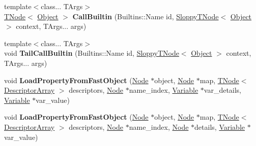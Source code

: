 \begin{DoxyCompactItemize}
\item 
\mbox{\label{classv8_1_1internal_1_1CodeStubAssembler_acec00379f57196c0fae059965a208130}} 
{\footnotesize template$<$class... T\+Args$>$ }\\\mbox{\hyperlink{classv8_1_1internal_1_1compiler_1_1TNode}{T\+Node}}$<$ \mbox{\hyperlink{classv8_1_1internal_1_1Object}{Object}} $>$ {\bfseries Call\+Builtin} (Builtins\+::\+Name id, \mbox{\hyperlink{classv8_1_1internal_1_1compiler_1_1SloppyTNode}{Sloppy\+T\+Node}}$<$ \mbox{\hyperlink{classv8_1_1internal_1_1Object}{Object}} $>$ context, T\+Args... args)
\item 
\mbox{\label{classv8_1_1internal_1_1CodeStubAssembler_aba2478fdc1b38b6bf264acf879470b83}} 
{\footnotesize template$<$class... T\+Args$>$ }\\void {\bfseries Tail\+Call\+Builtin} (Builtins\+::\+Name id, \mbox{\hyperlink{classv8_1_1internal_1_1compiler_1_1SloppyTNode}{Sloppy\+T\+Node}}$<$ \mbox{\hyperlink{classv8_1_1internal_1_1Object}{Object}} $>$ context, T\+Args... args)
\item 
\mbox{\label{classv8_1_1internal_1_1CodeStubAssembler_a822814b82da83377ff8bf7d4fbb0088f}} 
void {\bfseries Load\+Property\+From\+Fast\+Object} (\mbox{\hyperlink{classv8_1_1internal_1_1compiler_1_1Node}{Node}} $\ast$object, \mbox{\hyperlink{classv8_1_1internal_1_1compiler_1_1Node}{Node}} $\ast$map, \mbox{\hyperlink{classv8_1_1internal_1_1compiler_1_1TNode}{T\+Node}}$<$ \mbox{\hyperlink{classv8_1_1internal_1_1DescriptorArray}{Descriptor\+Array}} $>$ descriptors, \mbox{\hyperlink{classv8_1_1internal_1_1compiler_1_1Node}{Node}} $\ast$name\+\_\+index, \mbox{\hyperlink{classv8_1_1internal_1_1compiler_1_1CodeAssemblerVariable}{Variable}} $\ast$var\+\_\+details, \mbox{\hyperlink{classv8_1_1internal_1_1compiler_1_1CodeAssemblerVariable}{Variable}} $\ast$var\+\_\+value)
\item 
\mbox{\label{classv8_1_1internal_1_1CodeStubAssembler_adc3538a8caa29192c7039abbec372836}} 
void {\bfseries Load\+Property\+From\+Fast\+Object} (\mbox{\hyperlink{classv8_1_1internal_1_1compiler_1_1Node}{Node}} $\ast$object, \mbox{\hyperlink{classv8_1_1internal_1_1compiler_1_1Node}{Node}} $\ast$map, \mbox{\hyperlink{classv8_1_1internal_1_1compiler_1_1TNode}{T\+Node}}$<$ \mbox{\hyperlink{classv8_1_1internal_1_1DescriptorArray}{Descriptor\+Array}} $>$ descriptors, \mbox{\hyperlink{classv8_1_1internal_1_1compiler_1_1Node}{Node}} $\ast$name\+\_\+index, \mbox{\hyperlink{classv8_1_1internal_1_1compiler_1_1Node}{Node}} $\ast$details, \mbox{\hyperlink{classv8_1_1internal_1_1compiler_1_1CodeAssemblerVariable}{Variable}} $\ast$var\+\_\+value)

\end{DoxyCompactItemize}
